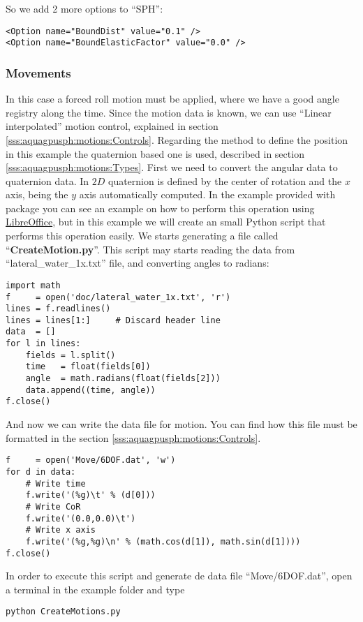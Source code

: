 %
So we add 2 more options to ``SPH'':
%
\begin{verbatim}
<Option name="BoundDist" value="0.1" />
<Option name="BoundElasticFactor" value="0.0" />
\end{verbatim}
%
\subsubsection{Movements}
%
In this case a forced roll motion must be applied, where we have a good angle registry along the time. Since the
motion data is known, we can use ``Linear interpolated'' motion control, explained in section
\ref{sss:aquagpusph:motions:Controls}. Regarding the method to define the position in this example the quaternion
based one is used, described in section \ref{sss:aquagpusph:motions:Types}.\rc
%
First we need to convert the angular data to quaternion data. In $2D$ quaternion is defined by the center of
rotation and the $x$ axis, being the $y$ axis automatically computed.\rc
%
In the example provided with \NAME package you can see an example on how to perform this operation using
\href{http://www.libreoffice.org}{LibreOffice}, but in this example we will create an small Python script that
performs this operation easily.\rc
%
We starts generating a file called ``\textbf{CreateMotion.py}''. This script may starts reading the data from
``lateral\_water\_1x.txt'' file, and converting angles to radians:
%
\begin{verbatim}
import math
f     = open('doc/lateral_water_1x.txt', 'r')
lines = f.readlines()
lines = lines[1:]     # Discard header line
data  = []
for l in lines:
    fields = l.split()
    time   = float(fields[0])
    angle  = math.radians(float(fields[2]))
    data.append((time, angle))
f.close()
\end{verbatim}
%
And now we can write the data file for \NAME motion. You can find how this file must be formatted in the section
\ref{sss:aquagpusph:motions:Controls}.
%
\begin{verbatim}
f     = open('Move/6DOF.dat', 'w')
for d in data:
    # Write time
    f.write('(%g)\t' % (d[0]))
    # Write CoR
    f.write('(0.0,0.0)\t')
    # Write x axis
    f.write('(%g,%g)\n' % (math.cos(d[1]), math.sin(d[1])))
f.close()
\end{verbatim}
%
In order to execute this script and generate de data file ``Move/6DOF.dat'', open a terminal in the example folder
and type
%
\begin{verbatim}
python CreateMotions.py
\end{verbatim}
